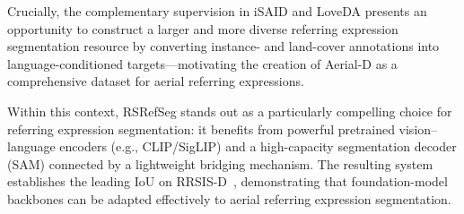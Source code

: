 Crucially, the complementary supervision in iSAID and LoveDA presents an opportunity to construct a larger and more diverse referring expression segmentation resource by converting instance- and land-cover annotations into language-conditioned targets—motivating the creation of Aerial-D as a comprehensive dataset for aerial referring expressions.

Within this context, RSRefSeg stands out as a particularly compelling choice for referring expression segmentation: it benefits from powerful pretrained vision–language encoders (e.g., CLIP/SigLIP) and a high-capacity segmentation decoder (SAM) connected by a lightweight bridging mechanism. The resulting system establishes the leading IoU on RRSIS-D~\cite{chen2025rsrefseg}, demonstrating that foundation-model backbones can be adapted effectively to aerial referring expression segmentation.
